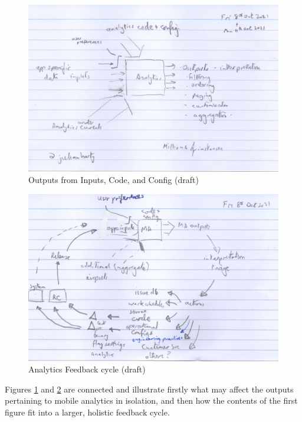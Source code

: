 \begin{figure}
    \centering
    \includegraphics[width=13cm]{images/rough-sketches/outputs_from_inputs_code_config-11-oct-2021.jpeg}
    \caption{Outputs from Inputs, Code, and Config (draft)}
    \label{fig:outputs_from_inputs_code_config}
\end{figure}

\begin{figure}
    \centering
    \includegraphics[width=13cm]{images/rough-sketches/analytics-feedback-cycle-11-oct-2021.jpeg}
    \caption{Analytics Feedback cycle (draft)}
    \label{fig:analytics-feedback-cycle}
\end{figure}

Figures \ref{fig:outputs_from_inputs_code_config} and \ref{fig:analytics-feedback-cycle} are connected and illustrate firstly what may affect the outputs pertaining to mobile analytics in isolation, and then how the contents of the first figure fit into a larger, holistic feedback cycle. 



